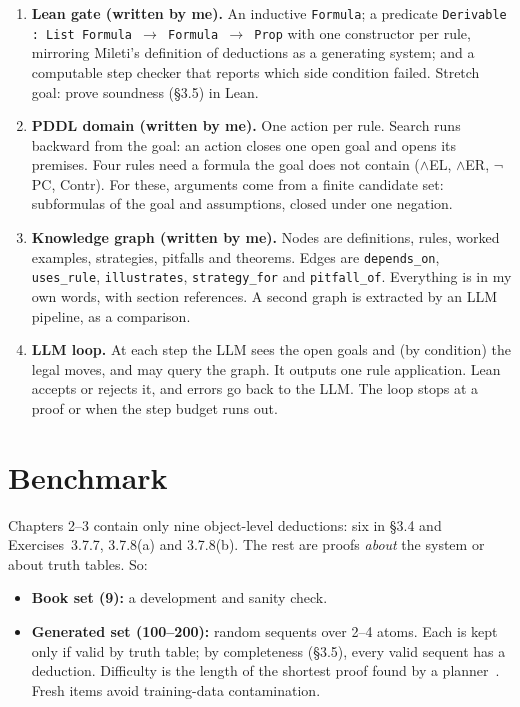\documentclass[11pt]{article}
\begin{document}
\begin{enumerate}[leftmargin=*]
  \item \textbf{Lean gate (written by me).} An inductive \texttt{Formula}; a predicate \texttt{Derivable : List Formula $\to$ Formula $\to$ Prop} with one constructor per rule, mirroring Mileti's definition of deductions as a generating system; and a computable step checker that reports which side condition failed. Stretch goal: prove soundness (\S3.5) in Lean.
  \item \textbf{PDDL domain (written by me).} One action per rule. Search runs backward from the goal: an action closes one open goal and opens its premises. Four rules need a formula the goal does not contain ($\wedge$EL, $\wedge$ER, $\neg$PC, Contr). For these, arguments come from a finite candidate set: subformulas of the goal and assumptions, closed under one negation.
  \item \textbf{Knowledge graph (written by me).} Nodes are definitions, rules, worked examples, strategies, pitfalls and theorems. Edges are \texttt{depends\_on}, \texttt{uses\_rule}, \texttt{illustrates}, \texttt{strategy\_for} and \texttt{pitfall\_of}. Everything is in my own words, with section references. A second graph is extracted by an LLM pipeline, as a comparison.
  \item \textbf{LLM loop.} At each step the LLM sees the open goals and (by condition) the legal moves, and may query the graph. It outputs one rule application. Lean accepts or rejects it, and errors go back to the LLM. The loop stops at a proof or when the step budget runs out.
\end{enumerate}

\section{Benchmark}
Chapters 2--3 contain only nine object-level deductions: six in \S3.4 and Exercises~3.7.7, 3.7.8(a) and 3.7.8(b). The rest are proofs \emph{about} the system or about truth tables. So:
\begin{itemize}[leftmargin=*]
  \item \textbf{Book set (9):} a development and sanity check.
  \item \textbf{Generated set (100--200):} random sequents over 2--4 atoms. Each is kept only if valid by truth table; by completeness (\S3.5), every valid sequent has a deduction. Difficulty is the length of the shortest proof found by a planner~\cite{helmert2006fastdownward}. Fresh items avoid training-data contamination.
\end{itemize}
\end{document}
